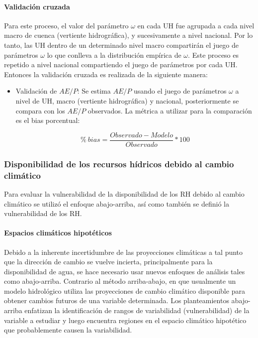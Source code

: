 \documentclass[12pt]{article}
\begin{document}
\paragraph{Validación cruzada}\mbox{}

Para este proceso, el valor del parámetro $\omega$ en cada UH fue agrupada a cada nivel macro de cuenca (vertiente hidrográfica), y sucesivamente a nivel nacional. Por lo tanto, las UH dentro de un determinado nivel macro compartirán el juego de parámetros $\omega$ lo que conlleva a la distribución empírica de $\omega$. Este proceso es repetido a nivel nacional compartiendo el juego de parámetros por cada UH. Entonces la validación cruzada es realizada de la siguiente manera:

\begin{itemize}
  \item Validación de $AE/P$: Se estima $AE/P$ usando el juego de parámetros $\omega$ a nivel de UH, macro (vertiente hidrográfica) y nacional, posteriormente se compara con los $AE/P$ observados. La métrica a utilizar para la comparación es el bias porcentual:
  
    \begin{equation}
    \%\ bias = \frac{Observado-Modelo}{Observado}*100
    \end{equation}
\end{itemize}

\subsubsection{Disponibilidad de los recursos hídricos debido al cambio climático}

Para evaluar la vulnerabilidad de la disponibilidad de los RH debido al cambio climático se utilizó el enfoque abajo-arriba, así como también se definió la vulnerabilidad de los RH.

\paragraph{Espacios climáticos hipotéticos}\mbox{}

Debido a la inherente incertidumbre de las proyecciones climáticas a tal punto que la dirección de cambio se vuelve incierta, principalmente para la disponibilidad de agua, se hace necesario usar nuevos enfoques de análisis tales como abajo-arriba. Contrario al método arriba-abajo, en que usualmente un modelo hidrológico utiliza las proyecciones de cambio climático disponible para obtener cambios futuros de una variable determinada. Los planteamientos abajo-arriba enfatizan la identificación de rangos de variabilidad (vulnerabilidad) de la variable a estudiar y luego encuentra regiones en el espacio climático hipotético que probablemente causen la variabilidad.
\end{document}
